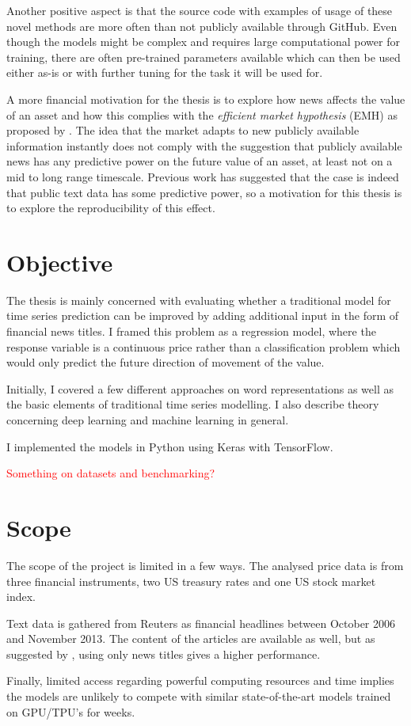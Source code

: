 Another positive aspect is that the source code with examples of usage of these novel methods are more often than not publicly available through GitHub. Even though the models might be complex and requires large computational power for training, there are often pre-trained parameters available which can then be used either as-is or with further tuning for the task it will be used for. 

A more financial motivation for the thesis is to explore how news affects the value of an asset and how this complies with the \textit{efficient market hypothesis} (EMH) as proposed by \citet{malkiel1970efficient}. The idea that the market adapts to new publicly available information instantly does not comply with the suggestion that publicly available news has any predictive power on the future value of an asset, at least not on a mid to long range timescale. Previous work has suggested that the case is indeed that public text data has some predictive power, so a motivation for this thesis is to explore the reproducibility of this effect.

\section{Objective}

The thesis is mainly concerned with evaluating whether a traditional model for time series prediction can be improved by adding additional input in the form of financial news titles. I framed this problem as a regression model, where the response variable is a continuous price rather than a classification problem which would only predict the future direction of movement of the value. 

Initially, I covered a few different approaches on word representations as well as the basic elements of traditional time series modelling. I also describe theory concerning deep learning and machine learning in general. 

I implemented the models in Python using Keras with TensorFlow. 

\textcolor{red}{Something on datasets and benchmarking?}

\section{Scope}
    
The scope of the project is limited in a few ways. The analysed price data is from three financial instruments, two US treasury rates and one US stock market index. 

Text data is gathered from Reuters as financial headlines between October 2006 and November 2013. The content of the articles are available as well, but as suggested by \citet{ding2014using}, using only news titles gives a higher performance. 

Finally, limited access regarding powerful computing resources and time implies the models are unlikely to compete with similar state-of-the-art models trained on GPU/TPU's for weeks. 










